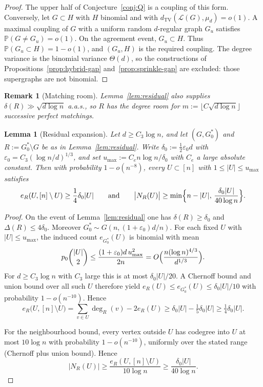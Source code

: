 \documentclass[11pt]{article}
\newtheorem{lemma}[theorem]{Lemma}
\newtheorem{remark}[theorem]{Remark}
\newcommand{\PP}{\mathbb{P}}
\newcommand{\dTV}{d_{\mathrm{TV}}}
\begin{document}
\begin{proof}
The upper half of Conjecture~\ref{conj:Q} is a coupling of this form.
Conversely, let \(G\subset H\) with \(H\) binomial and with \(\dTV(\mathcal{L}(G),\mu_d)=o(1)\).
A maximal coupling of \(G\) with a uniform random \(d\)-regular graph \(G_u\) satisfies \(\PP(G\neq G_u)=o(1)\).
On the agreement event, \(G_u\subset H\).
Thus \(\PP(G_u\subset H)=1-o(1)\), and \((G_u,H)\) is the required coupling.
The degree variance is the binomial variance \(\Theta(d)\), so the constructions of Propositions~\ref{prop:hybrid-gap} and~\ref{prop:sprinkle-gap} are excluded: those supergraphs are not binomial.
\end{proof}

\begin{remark}[Matching room]
\label{rem:matching-room}
Lemma~\ref{lem:residual} also supplies \(\delta(R)\gg\sqrt{d\log n}\) a.a.s., so \(R\) has
the degree room for \(m:=\lfloor C\sqrt{d\log n}\rfloor\) successive perfect
matchings.
\end{remark}

\begin{lemma}[Residual expansion]
\label{lem:residual-exp}
Let \(d\ge C_3\log n\), and let \((G,G^*_0)\) and \(R:=G^*_0\setminus G\) be as in
Lemma~\ref{lem:residual}.
Write \(\delta_0:=\tfrac12\varepsilon_0 d\) with \(\varepsilon_0=C_3(\log n/d)^{1/3}\), and set
\(u_{\max}:=C_e n\log n/\delta_0\) with \(C_e\) a large absolute constant.
Then with probability \(1-o(n^{-8})\), every \(U\subset[n]\) with
\(1\le|U|\le u_{\max}\) satisfies
\[
e_R(U,[n]\setminus U)\ge\frac14\delta_0|U|
\qquad\text{and}\qquad
\bigl|N_R(U)\bigr|\ge\min\Bigl\{n-|U|,\,\frac{\delta_0|U|}{40\log n}\Bigr\}.
\]
\end{lemma}

\begin{proof}
On the event of Lemma~\ref{lem:residual} one has \(\delta(R)\ge\delta_0\) and
\(\Delta(R)\le 4\delta_0\).
Moreover \(G^*_0\sim G(n,(1+\varepsilon_0)d/n)\).
For each fixed \(U\) with \(|U|\le u_{\max}\), the induced count \(e_{G^*_0}(U)\) is
binomial with mean
\[
p_0\binom{|U|}{2}
\le\frac{(1+\varepsilon_0)d\,u_{\max}^2}{2n}
=O\Bigl(\frac{n(\log n)^{4/3}}{d^{1/3}}\Bigr).
\]
For \(d\ge C_3\log n\) with \(C_3\) large this is at most \(\delta_0|U|/20\).
A Chernoff bound and union bound over all such \(U\) therefore yield
\(e_R(U)\le e_{G^*_0}(U)\le\delta_0|U|/10\) with probability \(1-o(n^{-10})\).
Hence
\[
e_R\bigl(U,[n]\setminus U\bigr)
=\sum_{v\in U}\deg_R(v)-2e_R(U)
\ge\delta_0|U|-\tfrac15\delta_0|U|
\ge\tfrac14\delta_0|U|.
\]

For the neighbourhood bound, every vertex outside \(U\) has codegree into \(U\) at
most \(10\log n\) with probability \(1-o(n^{-10})\), uniformly over the stated range
(Chernoff plus union bound).
Hence
\[
\bigl|N_R(U)\bigr|
\ge\frac{e_R(U,[n]\setminus U)}{10\log n}
\ge\frac{\delta_0|U|}{40\log n}.
\]
\end{proof}
\end{document}
